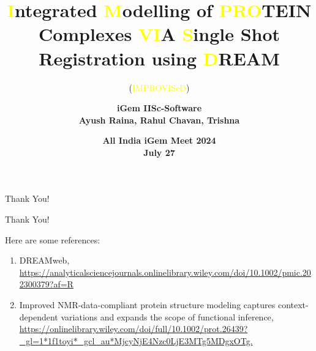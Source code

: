 \documentclass{beamer}
\author{\textbf{iGem IISc-Software} \\ \textbf{Ayush Raina, Rahul Chavan, Trishna}}
\title{\textcolor{yellow}{I}ntegrated \textcolor{yellow}{M}odelling of \textcolor{yellow}{PRO}TEIN Complexes \textcolor{yellow}{VI}A \textcolor{yellow}{S}ingle Shot Registration using \textcolor{yellow}{D}REAM}
\subtitle{(\textcolor{yellow}{IMPROVISeD})}
\date{\textcolor{mycolor}{\textbf{All India iGem Meet 2024 \\ July 27}}}
\begin{document}
\begin{frame}
    \titlepage
\end{frame}







\begin{frame}{Thank You!}
    \begin{center}
        \Huge Thank You!
    \end{center}
    Here are some references:
    \begin{enumerate}
        \item DREAMweb, \url{https://analyticalsciencejournals.onlinelibrary.wiley.com/doi/10.1002/pmic.202300379?af=R}
        \item Improved NMR-data-compliant protein structure modeling captures context-dependent variations and expands the scope of functional inference, \url{https://onlinelibrary.wiley.com/doi/full/10.1002/prot.26439?_gl=1*1f1toyi*_gcl_au*MjcyNjE4Nzc0LjE3MTg5MDgxOTg.}
    \end{enumerate}
\end{frame}
\end{document}
